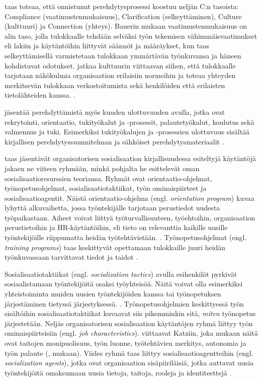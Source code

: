 \documentclass[utf8]{gradu3}
\begin{document}
\textcite{bauer-2010} taas toteaa, että onnistunut perehdytysprosessi koostuu neljän C:n tasoista: Compliance (vaatimustenmukaisuus), Clarification (selkeyttäminen), Culture (kulttuuri) ja Connection (yhteys). Bauerin mukaan vaatimustenmukaisuus on alin taso, jolla tulokkaalle tehdään selväksi työn tekemisen vähimmäisvaatimukset eli lakiin ja käytäntöihin liittyvät säännöt ja määräykset, kun taas selkeyttämisellä varmistetaan tulokkaan ymmärtävän työnkuvansa ja häneen kohdistuvat odotukset. \textcite{bauer-2010} jatkaa kulttuurin viittaavan siihen, että tulokkaalle tarjotaan näkökulmia organisaation erilaisiin normeihin ja toteaa yhteyden merkitsevän tulokkaan verkostoitumista sekä henkilöiden että erilaisten tietolähteiden kanssa. \parencite{bauer-2010}.

\textcite{bauer-2010} jäsentää perehdyttämistä myös kuuden ulottuvuuden avulla, jotka ovat rekrytointi, orientaatio, tukityökalut ja -prosessit, palautetyökalut, koulutus sekä valmennus ja tuki. Esimerkiksi tukityökalujen ja -prosessien ulottuvuus sisältää kirjallisen perehdytyssuunnitelman ja sähköiset perehdytysmateriaalit \parencite{bauer-2010}.

\textcite{saks-gruman-2012} taas jäsentävät organisatorisen sosialisaation kirjallisuudessa esiteltyjä käytäntöjä jakaen ne viiteen ryhmään, minkä pohjalta he esittelevät oman sosialisaatioresurssien teoriansa. Ryhmät ovat orientaatio-ohjelmat, työnopetusohjelmat, sosialisaatiotaktiikat, työn ominaispiirteet ja sosialisaatioagentit. Näistä orientaatio-ohjelma (engl. \textit{orientation program}) kuvaa lyhyttä alkuvaihetta, jossa työntekijälle tarjotaan perustiedot uudesta työpaikastaan. Aiheet voivat liittyä työturvallisuuteen, työehtoihin, organisaation perustietoihin ja HR-käytäntöihin, eli tieto on relevanttia kaikille uusille työntekijöille riippumatta heidän työtehtävistään. \parencite{saks-gruman-2012}. Työnopetusohjelmat (engl. \textit{training programs}) taas keskittyvät opettamaan tulokkaille juuri heidän työnkuvassaan tarvittavat tiedot ja taidot \parencite{saks-gruman-2012}.

Sosialisaatiotaktiikat (engl. \textit{socialization tactics}) avulla esihenkilöt pyrkivät sosiaalistamaan työntekijöitä osaksi työyhteisöä. Näitä voivat olla esimerkiksi yhteistoiminta muiden uusien työntekijöiden kanssa tai työnopetuksen järjestäminen tietyssä järjestyksessä. \parencite{saks-gruman-2012}. Työnopetusohjelmien keskittyessä työn sisältöihin sosialisaatiotaktiikat kuvaavat siis pikemminkin sitä, \textit{miten} työnopetus järjestetään. Neljäs organisatorisen sosialisaation käytäntöjen ryhmä liittyy työn ominaispiirteisiin (engl. \textit{job characteristics}). \textcite{saks-gruman-2012} viittaavat Katziin, joka mukaan näitä ovat taitojen monipuolisuus, työn luonne, työtehtävien merkitys, autonomia ja työn palaute (\textcite{katz-1980}, \textcite{saks-gruman-2012} mukaan). Viides ryhmä taas liittyy sosialisaatioagentteihin (engl. \textit{socialization agents}), jotka ovat organisaation sisäpiiriläisiä, jotka auttavat uusia työntekijöitä omaksumaan uusia tietoja, taitoja, rooleja ja identiteettejä \parencite{saks-gruman-2012}.
\end{document}
